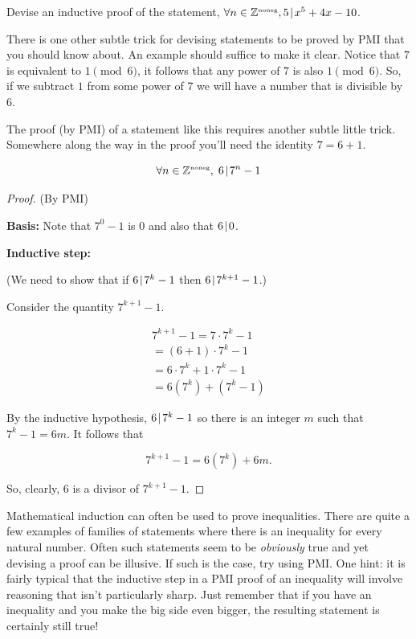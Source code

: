 \begin{exer}
Devise an inductive proof of the statement, $\forall n \in {\mathbb Z}^{\mbox{\tiny noneg}}, 5 \!\mid\! x^5+4x-10$.
\end{exer}

There is one other subtle trick for devising statements to be
proved by PMI that you should know about.  An example should 
suffice to make it clear.  Notice that $7$ is equivalent to $1 \pmod{6}$,
it follows that any power of $7$ is also $1 \pmod{6}$.  So, if we subtract
$1$ from some power of 7 we will have a number that is divisible by $6$.

The proof (by PMI) of a statement like this requires another subtle little
trick.  Somewhere along the way in the proof you'll need the identity $7=6+1$.

\begin{thm}
\[ \forall n \in {\mathbb Z}^{\mbox{\tiny noneg}}, \; 6 \!\mid\! 7^n-1 \]
\end{thm}

\begin{proof} (By PMI)

{\bf Basis:}  Note that $7^0-1$ is $0$ and also that $6 \!\mid\! 0$.

{\bf Inductive step:}  

\noindent (We need to show that if $6 \!\mid\! 7^k-1$ then $6 \!\mid\! 7^{k+1}-1$.)

\noindent Consider the quantity $7^{k+1}-1$.

\begin{gather*}
7^{k+1}-1 = 7 \cdot 7^k -1 \\
 = (6 + 1) \cdot 7^k - 1 \\
 = 6 \cdot 7^k + 1 \cdot 7^k - 1\\
 = 6(7^k) + (7^k - 1)
\end{gather*}

\noindent By the inductive hypothesis, $6 \!\mid\! 7^k - 1$ so there is
an integer $m$ such that $7^k - 1 = 6m$.  It follows that

\[ 7^{k+1}-1 = 6(7^k) + 6m. \]

So, clearly, $6$ is a divisor of $7^{k+1}-1$.

\end{proof}

Mathematical induction 
can often be used to prove inequalities.  There are quite a few examples
of families of statements where there is an inequality for every natural
number.  Often such statements seem to be \emph{obviously} true and yet 
devising a proof can be illusive.  If such is the case, try using PMI.
One hint: it is fairly typical that the inductive step in a PMI proof
of an inequality will involve reasoning that isn't particularly sharp. 
Just remember that if you have an inequality and you make the big
side even bigger, the resulting statement is certainly still true! 


